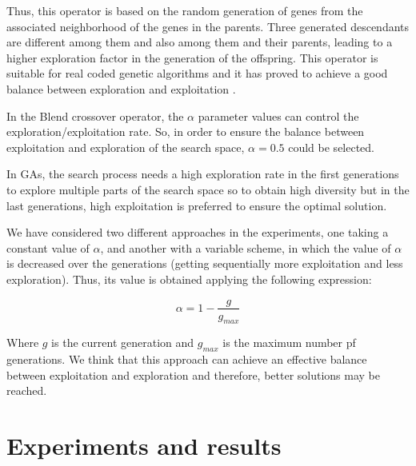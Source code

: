 \documentclass[conference]{IEEEtran}
\begin{document}
Thus, this operator is based on the random generation of genes from the associated neighborhood of the genes in the parents. Three generated descendants are different among them and also among them and their parents, leading to a higher exploration factor in the generation of the offspring.
This operator is suitable for real coded genetic algorithms and it has proved to achieve a good balance between exploration and exploitation \cite{blx2008}.

In the Blend crossover operator, the $\alpha$ parameter values can control the exploration/exploitation rate. So, in order to ensure the balance between exploitation and exploration of the search space, $\alpha = 0.5$ could be selected.

In GAs, the search process needs a high exploration rate in the first generations to explore multiple parts of the search space so to obtain high diversity but in the last generations, high exploitation is preferred to ensure the optimal solution.

We have considered two different approaches in the experiments, one taking a  constant value of $\alpha$, and another with a variable scheme, in which the value of $\alpha$ is decreased over the generations (getting sequentially more exploitation and less exploration). Thus, its value is obtained applying the following expression:

\begin{equation}
\label{eqalpha}
\alpha =1-\frac{g}{g_{max}}
\end{equation}

Where $g$ is the current generation and $g_{max}$ is the maximum number pf generations. We think that this approach can achieve an effective balance between exploitation and exploration and therefore, better solutions may be reached.






 



\section{Experiments and results}  
\label{sec:results}
\end{document}
